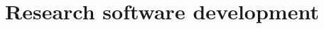 \documentclass[11pt,a4paper]{report}
\begin{document}





    \section*{Research software development}
\end{document}
